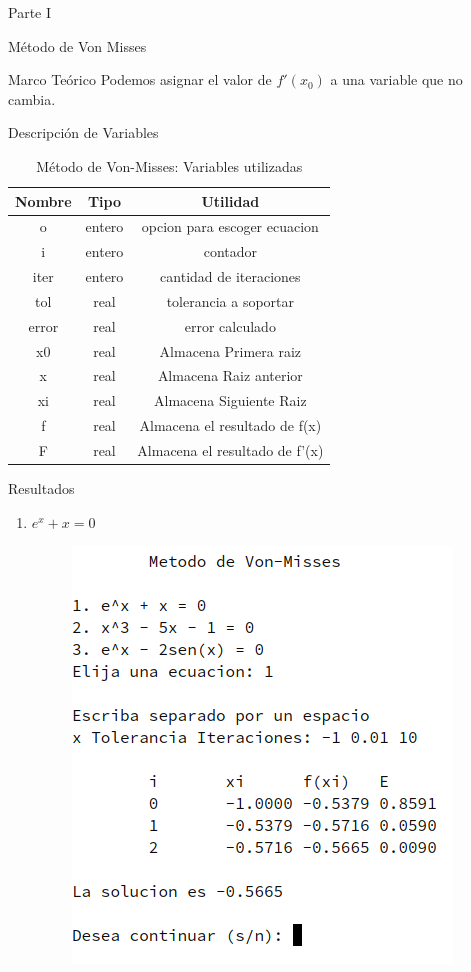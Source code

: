 \documentclass[legalpaper, 12pt]{article}
\def \eqa {\(e^x + x = 0\)}
\begin{document}
\begin{section}{Parte I}
\begin{subsection}{Método de Von Misses}
\begin{subsubsection}{Marco Teórico}
        Podemos asignar el valor de $f'(x_0)$ a una variable que no cambia.
      \end{subsubsection}
      \begin{subsubsection}{Descripción de Variables}
        \begin{table}[h]
          \centering
          \begin{tabular}{|c c c|}
            \hline
            Nombre & Tipo & Utilidad\\
            \hline\hline
            o & entero & opcion para escoger ecuacion \\
            i & entero & contador \\
            iter & entero & cantidad de iteraciones \\
            tol & real & tolerancia a soportar \\
            error & real & error calculado \\
            x0 & real & Almacena Primera raiz\\
            x & real & Almacena Raiz anterior\\
            xi & real & Almacena Siguiente Raiz\\
            f & real & Almacena el resultado de f(x)\\
            F & real & Almacena el resultado de f'(x)\\
            \hline
          \end{tabular}
          \caption{Método de Von-Misses: Variables utilizadas}
        \end{table}
      \end{subsubsection}
      \newpage
      \begin{subsubsection}{Resultados}
        \begin{enumerate}
          \item \eqa
          \begin{figure}[h]
            \centering
            \includegraphics[scale=0.8]{von1.png}

\end{figure}
\end{enumerate}
\end{subsubsection}
\end{subsection}
\end{section}
\end{document}
